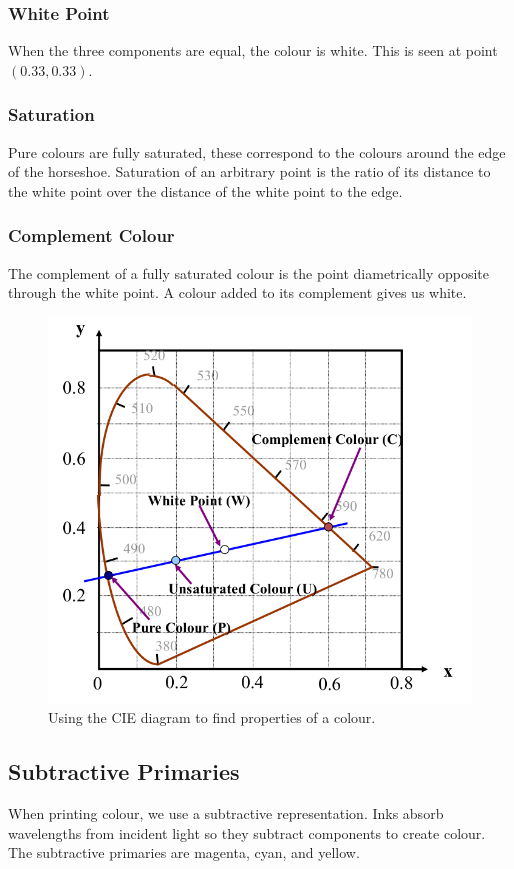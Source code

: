 \documentclass[11pt]{article}
\begin{document}
\subsubsection{White Point}
When the three components are equal, the colour is white.
This is seen at point $(0.33, 0.33)$.

\subsubsection{Saturation}
Pure colours are fully saturated, these correspond to the colours around the edge of the horseshoe.
Saturation of an arbitrary point is the ratio of its distance to the white point over the distance of the white point to the edge.

\subsubsection{Complement Colour}
The complement of a fully saturated colour is the point diametrically opposite through the white point.
A colour added to its complement gives us white.

\begin{figure}[htb!]
  \centering
  \caption{Using the CIE diagram to find properties of a colour.}
  \includegraphics[scale=0.3]{cie2}
\end{figure}

\subsection{Subtractive Primaries}
When printing colour, we use a subtractive representation.
Inks absorb wavelengths from incident light so they subtract components to create colour.
The subtractive primaries are magenta, cyan, and yellow.
\end{document}
